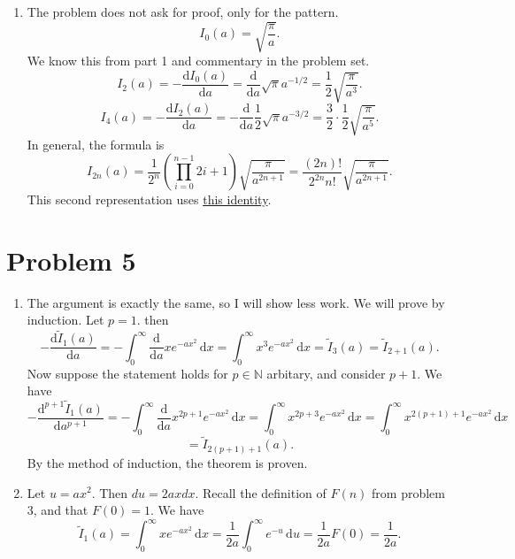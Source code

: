 \documentclass[11pt, letterpaper]{article}
\begin{document}
\begin{enumerate}
\[			(-1)^{p+1} \frac{\mathrm{d}^{p+1} I_0(a)}{\mathrm{d}a^{p+1} } =-\int_{-\infty }^{\infty } \frac{\mathrm{d}}{\mathrm{d}a} x^{2p} e^{-ax^2}  \,\mathrm{d} x=-\int_{-\infty }^{\infty } x^{2p} \left( -x^2 \right) e^{-ax^2}  \,\mathrm{d} x
		\]
		\[
			=\int_{-\infty }^{\infty } x^{2(p+1)} e^{-ax^2}  \,\mathrm{d} x=I_{2(p+1)} (a)
		.\]
		Therefore,
		\[
			(-1)^{p} \frac{\mathrm{d}^pI_0(a)}{\mathrm{d}a^p} =I_{2p} (a)
		.\]
	\item The problem does not ask for proof, only for the pattern.
		\[
			I_0(a)=\sqrt{\frac{\pi }{a} } 
		.\]
		We know this from part 1 and commentary in the problem set.
		\[
			I_2(a)=-\frac{\mathrm{d}I_0(a)}{\mathrm{d}a} =\frac{\mathrm{d}}{\mathrm{d}a} \sqrt{\pi } a^{-1/2} =\frac{1}{2} \sqrt{\frac{\pi }{a^3} } 
		.\]
		\[
			I_4(a)=-\frac{\mathrm{d}I_2(a)}{\mathrm{d}a} =-\frac{\mathrm{d}}{\mathrm{d}a}\frac{1}{2}  \sqrt{\pi } a^{-3/2} =\frac{3}{2} \cdot \frac{1}{2} \sqrt{\frac{\pi }{a^{5} } } 
		.\]
		In general, the formula is
		\[
			I_{2n} (a)=\frac{1}{2^n} \left( \prod_{i=0}^{n-1} 2i+1 \right) \sqrt{\frac{\pi }{a^{2n+1} } }=\frac{(2n)!}{2^{2n} n!} \sqrt{\frac{\pi }{a^{2n+1} } } 
		.\]
		This second representation uses \href{https://math.stackexchange.com/a/69163}{this identity}.
\end{enumerate}
\section*{Problem 5}
\begin{enumerate}
	\item The argument is exactly the same, so I will show less work. We will prove by induction. Let $p=1$. then
		\[
			-\frac{\mathrm{d}\widetilde{I}_1(a)}{\mathrm{d}a} =-\int_{0}^{\infty } \frac{\mathrm{d}}{\mathrm{d}a} xe^{-ax^2}  \,\mathrm{d} x=\int_{0}^{\infty } x^3 e^{-ax^2}  \,\mathrm{d} x=\widetilde{I} _3(a)=\widetilde{I} _{2+1} (a)
		.\]
		Now suppose the statement holds for $p\in\mathbb{N} $ arbitary, and consider $p+1$. We have
		\[
			- \frac{\mathrm{d}^{p+1} \widetilde{I}_1(a)}{\mathrm{d}a^{p+1} } =-\int_{0}^{\infty } \frac{\mathrm{d}}{\mathrm{d}a} x^{2p+1} e^{-ax^2}  \,\mathrm{d} x=\int_{0}^{\infty } x^{2p+3} e^{-ax^2}  \,\mathrm{d} x=\int_{0}^{\infty } x^{2(p+1)+1} e^{-ax^2}  \,\mathrm{d} x
		\]
		\[
			=\widetilde{I}_{2(p+1)+1} (a)
		.\]
	By the method of induction, the theorem is proven.

	\item Let $u=ax^2$. Then $du=2axdx$. Recall the definition of $F(n)$ from problem 3, and that $F(0)=1$. We have
		\[
			\widetilde{I}_1(a)=\int_{0}^{\infty } xe^{-ax^2}  \,\mathrm{d} x= \frac{1}{2a}\int_{0}^{\infty } e^{-u}  \,\mathrm{d} u=\frac{1}{2a} F(0)=\frac{1}{2a} 
		.\]
\end{enumerate}
\end{document}
